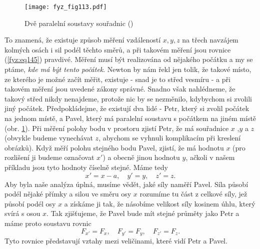     \begin{figure}[ht!]  %
      \centering
      \texttt{[image: fyz\_fig113.pdf]}
      \caption{Dvě paralelní soustavy souřadnic (\cite[s.~154]{Feynman01})}
      \label{fyz:fig113}
    \end{figure}
    To znamená, že existuje způsob měření vzdáleností \(x, y, z\) na třech navzájem kolmých osách i 
    sil podél těchto směrů, a při takovém měření jsou rovnice (\ref{fyz:eq145}) pravdivé. Měření 
    musí být realizována od nějakého počátku a my se ptáme, \emph{kde má být tento počátek}. Newton 
    by nám řekl jen tolik, že takové místo, ze kterého je možné začít měřit, existuje - snad je to 
    střed vesmíru - a při takovém měření jsou uvedené zákony správné. Snadno však nahlédneme, že 
    takový střed nikdy nenajdeme, protože nic by se nezměnilo, kdybychom si zvolili jiný počátek. 
    Předpokládejme, že existují dva lidé - Petr, který si zvolil počátek na jednom místě, a Pavel, 
    který má paralelní soustavu s počátkem na jiném místě (obr. \ref{fyz:fig113}). Při měření 
    polohy bodu v prostoru zjistí Petr, že má souřadnice \(x\) ,\(y\) a \(z\) (obvykle budeme 
    vynechávat \(z\), abychom se vyhnuli komplikacím při kreslení obrázků). Když měří polohu 
    stejného bodu Pavel, zjistí, že má hodnotu \(x\) (pro rozlišení ji budeme označovat \(x'\)) a 
    obecně jinou hodnotu \(y\), ačkoli v našem příkladu jsou tyto hodnoty číselně stejné. Máme tedy
    \begin{equation}\label{fyz:eq146}
      x' = x - a, \quad y' = y, \quad z' = z.
    \end{equation}
    Aby byla naše analýza úplná, musíme vědět, jaké síly naměří Pavel. Síla působí podél nějaké 
    přímky a silou ve směru osy \(x\) rozumíme tu část z celkové síly, jež působí podél osy \(x\) a 
    získáme ji tak, že násobíme velikost síly kosinem úhlu, který svírá s osou \(x\). Tak 
    zjišťujeme, že Pavel bude mít stejné průměty jako Petr a máme proto soustavu rovnic
    \begin{equation}\label{fyz:eq147}
      F_{x'} = F_x, \quad F_{y'} = F_y, \quad F_{z'} = F_z.
    \end{equation}
    Tyto rovnice představují vztahy mezi veličinami, které vidí Petr a Pavel.
    
